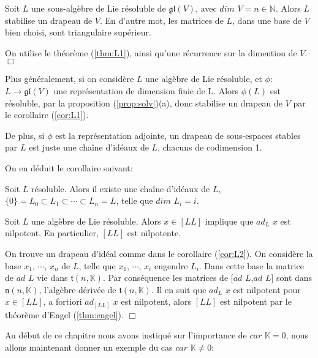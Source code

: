 \documentclass[a4paper,openany,12pt]{report}
\newcommand{\KK}{\mathbb{K}}
\newcommand{\NN}{\mathbb{N}}
\newcommand{\gl}{\mathfrak{gl}}
\newcommand{\ttt}{\mathfrak{t}}
\newcommand{\nn}{\mathfrak{n}}
\theoremstyle{break}
{\theorembodyfont{\upshape}
\newtheorem*{rmq}{Remarque :}
\newtheorem*{prv}{Preuve :}
\newtheorem*{ex}{Exemples :}
\newtheorem*{exe}{Exemple : }
\newtheorem*{nota}{Notation :}
\newtheorem*{dem}{D\'emonstration :}}
\begin{document}
\begin{cor}\label{cor:L1}
\quad Soit $L$ une sous-algèbre de Lie résoluble de $\gl(V)$, avec $dim$ $V = n \in \NN$. Alors $L$ stabilise un drapeau de $V$.
En d'autre mot, les matrices de $L$, dans une base de $V$ bien choisi, sont triangulaire supérieur.
\end{cor}

\begin{prv}
\quad On utilise le théorème (\ref{thm:L1}), ainsi qu'une récurrence sur la dimention de $V$. $\Box$
\end{prv}

Plus généralement, si on considère $L$ une algèbre de Lie résoluble, et $\phi$: $L \to \gl(V)$ une représentation de dimension finie de L. Alors $\phi(L)$ est résoluble, par la proposition (\ref{prop:solv})(a), donc stabilise un drapeau de $V$ par le corollaire (\ref{cor:L1}).

De plus, si $\phi$ est la représentation adjointe, un drapeau de sous-espaces stables par $L$ est juste une chaîne d'idéaux de $L$, chacuns de codimension 1.

On en déduit le corollaire suivant: 

\begin{cor}\label{cor:L2}
\quad Soit $L$ résoluble. 
Alors il existe une chaîne d'idéaux de $L$, $\{0\}=L_{0} \subset L_{1} \subset \cdots \subset L_{n} = L$, telle que $dim$ $L_{i}=i$.
\end{cor}

\begin{cor}\label{cor:L3}
\quad Soit $L$ une algèbre de Lie résoluble. Alors $x \in [LL]$ implique que $ad_{L}$ $x$ est nilpotent.
En particulier, $[LL]$ est nilpotente.
\end{cor}

\begin{prv}
\quad On trouve un drapeau d'idéal comme dans le corollaire (\ref{cor:L2}). On considère la base $x_{1}$, $\cdots$, $x_{n}$ de $L$, telle que $x_{1}$, $\cdots$, $x_{i}$ engendre $L_{i}$. Dans cette base la matrice de $ad$ $L$ vie dans $\ttt(n,\KK)$. Par conséquence les matrices de $[ad$ $L$,$ad$ $L]$ sont dans $\nn(n,\KK)$, l'algèbre dérivée de $\ttt(n,\KK)$. Il en suit que $ad_{L}$ $x$ est nilpotent pour $x \in [LL]$, a fortiori $ad_{[LL]}$ $x$ est nilpotent, alors $[LL]$ est nilpotent par le théorème d'Engel (\ref{thm:engel}). $\Box$
\end{prv}

Au début de ce chapitre nous avons instiqué sur l'importance de $car$ $\KK = 0$, nous allons maintenant donner un exemple du cas $car$ $\KK \neq 0$:
\end{document}
